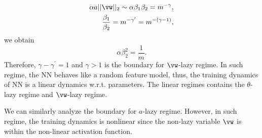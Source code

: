 \documentclass{article}
\begin{document}
\begin{align}
    \alpha a ||\vw||_{2}\sim \alpha\beta_1 \beta_2=m^{-\gamma}, \\
    \frac{\beta_1}{\beta_2}=m^{-\gamma^{\prime}}=m^{-(\gamma-1)},
\end{align}
we obtain
\[
    \alpha \beta_{2}^{2}=\frac{1}{m}.
\]
Therefore, $\gamma-\gamma^{\prime}=1$ and $\gamma>1$ is the boundary for $\vw$-lazy regime. In such regime, the NN behaves like a random feature model, thus, the training dynamics of NN is a linear dynamics w.r.t. parameters. The linear regimes contains the $\theta$-lazy regime and $\vw$-lazy regime.

We can similarly analyze the boundary for $a$-lazy regime. However, in such regime, the training dynamics is nonlinear since the non-lazy variable $\vw$ is within the non-linear activation function.
\end{document}
